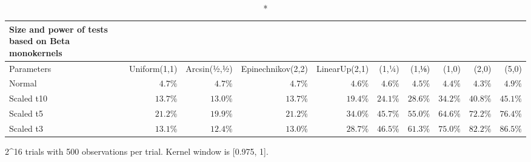 \setlength{\LTpost}{0mm}
\begin{longtable}{lrrrrrrrrr}
\caption*{
{\large Size and power of tests based on Beta monokernels}
} \\ 
\toprule
Parameters & Uniform(1,1) & Arcsin(½,½) & Epinechnikov(2,2) & LinearUp(2,1) & (1,¼) & (1,⅛) & (1,0) & (2,0) & (5,0) \\ 
\midrule
Normal & $4.7\%$ & $4.7\%$ & $4.7\%$ & $4.6\%$ & $4.6\%$ & $4.5\%$ & $4.4\%$ & $4.3\%$ & $4.9\%$ \\ 
Scaled t10 & $13.7\%$ & $13.0\%$ & $13.7\%$ & $19.4\%$ & $24.1\%$ & $28.6\%$ & $34.2\%$ & $40.8\%$ & $45.1\%$ \\ 
Scaled t5 & $21.2\%$ & $19.9\%$ & $21.2\%$ & $34.0\%$ & $45.7\%$ & $55.0\%$ & $64.6\%$ & $72.2\%$ & $76.4\%$ \\ 
Scaled t3 & $13.1\%$ & $12.4\%$ & $13.0\%$ & $28.7\%$ & $46.5\%$ & $61.3\%$ & $75.0\%$ & $82.2\%$ & $86.5\%$ \\ 
\bottomrule
\end{longtable}
\begin{minipage}{\linewidth}
2\textasciicircum{}16 trials with 500 observations per trial.  Kernel window is [0.975, 1].\\
\end{minipage}

